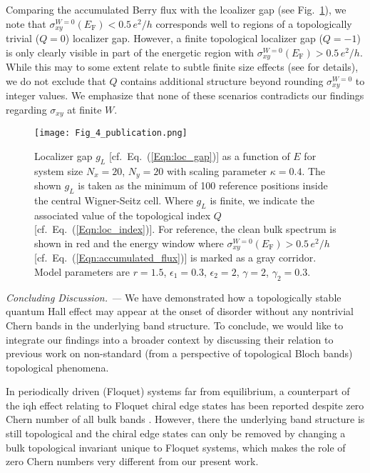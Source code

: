 \documentclass[aps,prb,amsmath,amssymb,twocolumn, superscriptaddress]{revtex4-2}
\newcommand{\eq}[1]{Eq.~(\ref{#1})}
\begin{document}
Comparing the accumulated Berry flux with the lcoalizer gap (see Fig.~\ref{Fig:spec_loc}), we note that $\sigma_{xy}^{W=0}(E_\mathrm{F})<0.5\, e^2 / h$ corresponds well to regions of a topologically trivial ($Q=0$) localizer gap. However, a finite topological localizer gap ($Q= -1$) is only clearly visible in part of the energetic region with $\sigma_{xy}^{W=0}(E_\mathrm{F}) > 0.5\, e^2 / h$. While this may to some extent relate to subtle finite size effects (see \cite{Supplemental} for details), we do not exclude that $Q$ contains additional structure beyond rounding $\sigma_{xy}^{W=0}$ to integer values. We emphasize that none of these scenarios contradicts our findings regarding $\sigma_{xy}$ at finite $W$.  

\begin{figure}[htp!]	 
{\texttt{[image: Fig\_4\_publication.png]}}
\caption{Localizer gap $g_L$ [cf.~\eq{Eqn:loc_gap}] as a function of $E$ for system size $N_x = 20$, $N_y = 20$ with scaling parameter $\kappa = 0.4$. The shown $g_L$ is taken as the minimum of 100 reference positions inside the central Wigner-Seitz cell. Where $g_L$ is finite, we indicate the associated value of the topological index $Q$ [cf.~\eq{Eqn:loc_index}]. For reference, the clean bulk spectrum is shown in red and the energy window where $\sigma_{xy}^{W=0}(E_\mathrm{F})  > 0.5 \,e^2 / h$ [cf.~\eq{Eqn:accumulated_flux}] is marked as a gray corridor. Model parameters are $r = 1.5$, $\epsilon_1 = 0.3$, $\epsilon_2 = 2$, $\gamma  =2$, $\gamma_2 = 0.3$.}\label{Fig:spec_loc}
\end{figure}

{\it Concluding Discussion. ---} 
We have demonstrated how a topologically stable quantum Hall effect may appear at the onset of disorder without any nontrivial Chern bands in the underlying band structure. To conclude, we would like to integrate our findings into a broader context by discussing their relation to previous work on non-standard (from a perspective of topological Bloch bands) topological phenomena.

In periodically driven (Floquet) systems far from equilibrium, a counterpart of the \gls{iqh} effect relating to Floquet chiral edge states has been reported despite zero Chern number of all bulk bands \cite{Anomalous_Floquet_AI, Anomalous_BBC}. However, there the underlying band structure is still topological and the chiral edge states can only be removed by changing a bulk topological invariant unique to Floquet systems, which makes the role of zero Chern numbers very different from our present work.
\end{document}
